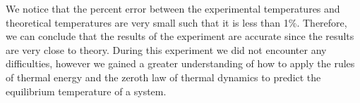 \documentclass[12pt]{article}
\begin{document}
We notice that the percent error between the experimental temperatures and theoretical temperatures are very small such that it is less than 1\%. Therefore, we can conclude that the results of the experiment are accurate since the results are very close to theory. During this experiment we did not encounter any difficulties, however we gained a greater understanding of how to apply the rules of thermal energy and the zeroth law of thermal dynamics to predict the equilibrium temperature of a system.
\end{document}
